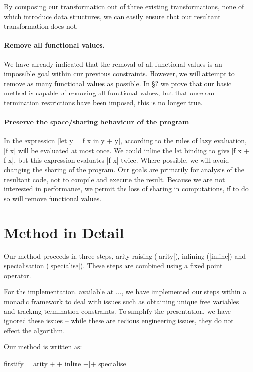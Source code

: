 \documentclass[preprint]{sigplanconf}
\begin{document}
By composing our transformation out of three existing transformations, none of which introduce data structures, we can easily ensure that our resultant transformation does not.

\paragraph{Remove all functional values.} We have already indicated that the removal of all functional values is an impossible goal within our previous constraints. However, we will attempt to remove as many functional values as possible. In \S? we prove that our basic method is capable of removing all functional values, but that once our termination restrictions have been imposed, this is no longer true.

\paragraph{Preserve the space/sharing behaviour of the program.} In the expression |let y = f x in y + y|, according to the rules of lazy evaluation, |f x| will be evaluated at most once. We could inline the let binding to give |f x + f x|, but this expression evaluates |f x| twice. Where possible, we will avoid changing the sharing of the program. Our goals are primarily for analysis of the resultant code, not to compile and execute the result. Because we are not interested in performance, we permit the loss of sharing in computations, if to do so will remove functional values.

\section{Method in Detail}

Our method proceeds in three steps, arity raising (|arity|), inlining (|inline|) and specialisation (|specialise|). These steps are combined using a fixed point operator.

For the implementation, available at ..., we have implemented our steps within a monadic framework to deal with issues such as obtaining unique free variables and tracking termination constraints. To simplify the presentation, we have ignored these issues -- while these are tedious engineering issues, they do not effect the algorithm.

Our method is written as:

\begin{code}
firstify = arity +|+ inline +|+ specialise
\end{code}
\end{document}
